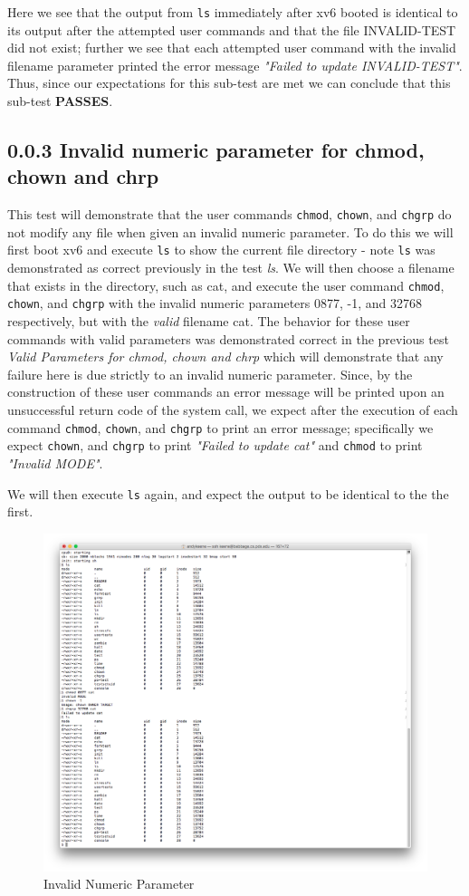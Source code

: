 \documentclass[11pt,letterpaper]{report}
\begin{document}
\pagebreak

Here we see that the output from {\tt ls} immediately after xv6 booted is identical to its output after the attempted user commands and that the file INVALID-TEST did not exist; further we see that each attempted user command with 
the invalid filename parameter printed the error message \emph{"Failed to update INVALID-TEST"}. Thus, since our expectations for this sub-test are met we can conclude that this sub-test \textbf{PASSES}. 


		\subsection*{0.0.3 Invalid numeric parameter for chmod, chown and chrp}
		This test will demonstrate that the user commands {\tt chmod}, {\tt chown}, and {\tt chgrp} do not modify any file when given an invalid numeric parameter.
		To do this we will first boot xv6 and execute {\tt ls} to show the current file directory - note {\tt ls} was demonstrated as correct previously in the test \emph{ls}. We will then choose a filename that exists in the
		directory, such as cat, and execute the user command {\tt chmod}, {\tt chown}, and {\tt chgrp} with the invalid numeric parameters 0877, -1, and 32768 respectively, but with the \emph{valid} filename cat. The behavior for
		these user commands with valid parameters was demonstrated correct in the previous test \emph{Valid Parameters for chmod, chown and chrp} which will demonstrate that any failure here is due strictly to an invalid numeric parameter.
		Since, by the construction of these user commands an error message will be printed upon an unsuccessful return code of the system call, we expect after the execution of each command  {\tt chmod}, {\tt chown}, and {\tt chgrp} 
		to print an error message; specifically we expect {\tt chown}, and {\tt chgrp} to print \emph{"Failed to update cat"} and {\tt chmod} to print \emph{"Invalid MODE"}. 
		
		We will then execute {\tt ls} again, and expect the output to be identical to the the first.
		
\begin{figure}[h!]
\centering
\includegraphics[width=0.8\linewidth]{invalidnumeric.png}
\caption{Invalid Numeric Parameter}
\label{fig:datetest}
\end{figure}
\end{document}
